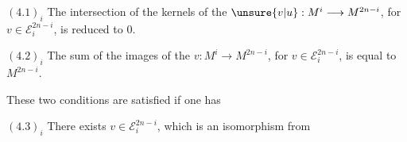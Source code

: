 $(4.1)_i$ The intersection of the kernels of the $\unsure{v|u}:M^i\longrightarrow M^{2n-i}$, for $v\in\mathcal E_i^{2n-i}$, is reduced to $0$.

$(4.2)_i$ The sum of the images of the $v:M^i\longrightarrow M^{2n-i}$, for $v\in\mathcal E_i^{2n-i}$, is  equal to $M^{2n-i}$.

These two conditions are satisfied if one has

$(4.3)_i$ There exists  $v\in\mathcal E_i^{2n-i}$, which is an isomorphism from
